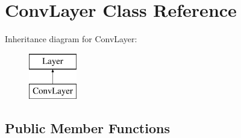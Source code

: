 \hypertarget{class_conv_layer}{\section{Conv\+Layer Class Reference}
\label{class_conv_layer}
}
Inheritance diagram for Conv\+Layer\+:\begin{figure}[H]
\begin{center}
\leavevmode
\includegraphics[height=2.000000cm]{class_conv_layer}
\end{center}
\end{figure}
\subsection*{Public Member Functions}
